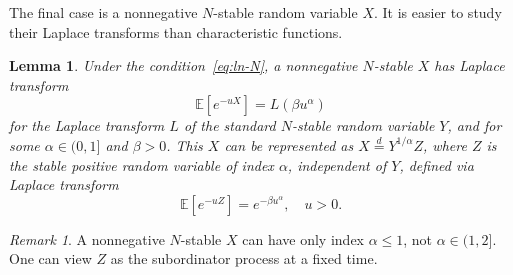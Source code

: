 \documentclass[12pt]{amsart}
\newtheorem{lemma}{Lemma}[section]
\theoremstyle{remark}
\newtheorem{remark}{Remark}[section]
\theoremstyle{definition}
\begin{document}
The final case is a nonnegative $N$-stable random variable $X$. It is easier to study their Laplace transforms than characteristic functions. 

\begin{lemma} Under the condition~\eqref{eq:ln-N}, a nonnegative $N$-stable $X$ has Laplace transform 
$$
\mathbb E\left[e^{-uX}\right] = L(\beta u^{\alpha})
$$
for the Laplace transform $L$ of the standard $N$-stable random variable $Y$, and for some $\alpha \in (0, 1]$ and $\beta > 0$. This $X$ can be represented as $X \stackrel{d}{=} Y^{1/\alpha}Z$, where $Z$ is the stable positive random variable of index $\alpha$, independent of $Y$, defined via Laplace transform
\begin{equation}
\label{eq:Laplace-alpha}
\mathbb E\left[e^{-uZ}\right] = e^{-\beta u^{\alpha}},\quad u > 0.
\end{equation}
\label{lemma:positive}
\end{lemma}

\begin{remark}
A nonnegative $N$-stable $X$ can have only index $\alpha \le 1$, not 
$\alpha \in (1, 2]$. One can view $Z$ as the subordinator process at a fixed time. 
\end{remark}
\end{document}
